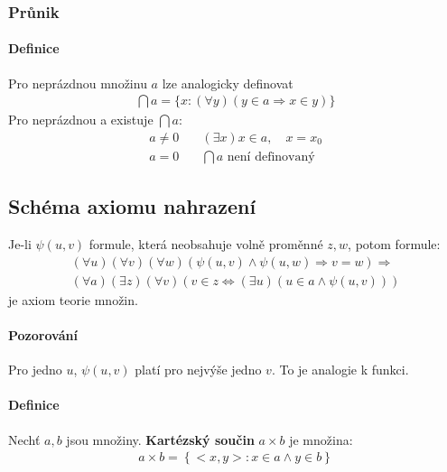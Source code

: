 \documentclass[a4paper,12pt,titlepage]{article}
\begin{document}
\subsubsection{Průnik}
\setcounter{equation}{0}
\paragraph{Definice}
Pro neprázdnou množinu $a$ lze analogicky definovat
\begin{align}
	\bigcap a = \{ x : (\forall y) (y \in a \Rightarrow x \in y) \}
\end{align}
Pro neprázdnou a existuje $\bigcap a$: 
\begin{align}
	a \neq 0 \quad &(\exists x) x \in a, \quad x = x_0 \\
	a = 0 \quad &\bigcap a \text{ není definovaný }
\end{align}


\subsection{Schéma axiomu nahrazení}
\setcounter{equation}{0}
Je-li $\psi(u,v)$ formule, která neobsahuje volně proměnné $z,w$, potom formule:
\begin{align}
	\label{axiom-nahrazeni-predpoklad}
	(\forall u)(\forall v)(\forall w) ( \psi(u,v) \land \psi(u,w) \Rightarrow
	v=w) \Rightarrow \\
	(\forall a) (\exists z) (\forall v) (v \in z \Leftrightarrow (\exists u)(u
	\in a \land \psi(u,v)))
\end{align}
je axiom teorie množin.
\paragraph{Pozorování}
Pro jedno $u$, $\psi(u,v)$ platí pro nejvýše jedno $v$. To je analogie k funkci.
\paragraph{Definice}
Nechť $a,b$ jsou množiny. \textbf{Kartézský součin} $a \times b$ je množina:
\begin{align}
	a \times b = \left\{ <x,y> : x \in a \land y \in b \right\}
\end{align}
\end{document}
